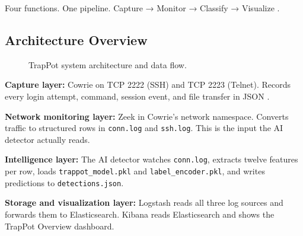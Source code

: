 Four functions. One pipeline. Capture → Monitor → Classify → Visualize \cite{franco2021survey,rodriguezgomez2025systematic,lanz2025optimizing}.

\subsection{Architecture Overview}
\label{subsec:high_level_arch}

\begin{figure}[htbp]
\centering
{}
\caption{TrapPot system architecture and data flow.}
\label{fig:system_architecture}
\end{figure}

\textbf{Capture layer:} Cowrie on TCP 2222 (SSH) and TCP 2223 (Telnet). Records every login attempt, command, session event, and file transfer in JSON \cite{9071014,log2evt2025}.

\textbf{Network monitoring layer:} Zeek in Cowrie's network namespace. Converts traffic to structured rows in \texttt{conn.log} and \texttt{ssh.log}. This is the input the AI detector actually reads.

\textbf{Intelligence layer:} The AI detector watches \texttt{conn.log}, extracts twelve features per row, loads \texttt{trappot\_model.pkl} and \texttt{label\_encoder.pkl}, and writes predictions to \texttt{detections.json}.

\textbf{Storage and visualization layer:} Logstash reads all three log sources and forwards them to Elasticsearch. Kibana reads Elasticsearch and shows the TrapPot Overview dashboard.

